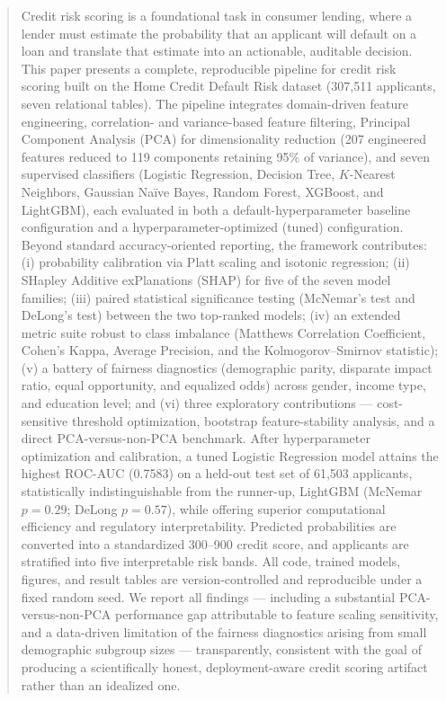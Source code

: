\documentclass[journal]{IEEEtran}
\begin{document}
\begin{abstract}
Credit risk scoring is a foundational task in consumer lending, where a lender must estimate the probability that an applicant will default on a loan and translate that estimate into an actionable, auditable decision. This paper presents a complete, reproducible pipeline for credit risk scoring built on the Home Credit Default Risk dataset (307,511 applicants, seven relational tables). The pipeline integrates domain-driven feature engineering, correlation- and variance-based feature filtering, Principal Component Analysis (PCA) for dimensionality reduction (207 engineered features reduced to 119 components retaining 95\% of variance), and seven supervised classifiers (Logistic Regression, Decision Tree, $K$-Nearest Neighbors, Gaussian Naïve Bayes, Random Forest, XGBoost, and LightGBM), each evaluated in both a default-hyperparameter baseline configuration and a hyperparameter-optimized (tuned) configuration. Beyond standard accuracy-oriented reporting, the framework contributes: (i) probability calibration via Platt scaling and isotonic regression; (ii) SHapley Additive exPlanations (SHAP) for five of the seven model families; (iii) paired statistical significance testing (McNemar's test and DeLong's test) between the two top-ranked models; (iv) an extended metric suite robust to class imbalance (Matthews Correlation Coefficient, Cohen's Kappa, Average Precision, and the Kolmogorov--Smirnov statistic); (v) a battery of fairness diagnostics (demographic parity, disparate impact ratio, equal opportunity, and equalized odds) across gender, income type, and education level; and (vi) three exploratory contributions --- cost-sensitive threshold optimization, bootstrap feature-stability analysis, and a direct PCA-versus-non-PCA benchmark. After hyperparameter optimization and calibration, a tuned Logistic Regression model attains the highest ROC-AUC (0.7583) on a held-out test set of 61,503 applicants, statistically indistinguishable from the runner-up, LightGBM (McNemar $p=0.29$; DeLong $p=0.57$), while offering superior computational efficiency and regulatory interpretability. Predicted probabilities are converted into a standardized 300--900 credit score, and applicants are stratified into five interpretable risk bands. All code, trained models, figures, and result tables are version-controlled and reproducible under a fixed random seed. We report all findings --- including a substantial PCA-versus-non-PCA performance gap attributable to feature scaling sensitivity, and a data-driven limitation of the fairness diagnostics arising from small demographic subgroup sizes --- transparently, consistent with the goal of producing a scientifically honest, deployment-aware credit scoring artifact rather than an idealized one.
\end{abstract}
\end{document}
